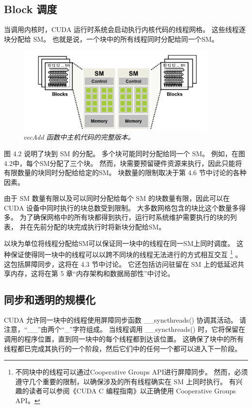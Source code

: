 \subsection{Block 调度}
当调用内核时，CUDA 运行时系统会启动执行内核代码的线程网格。 这些线程逐块分配给 SM。 
也就是说，一个块中的所有线程同时分配给同一个SM。

\begin{figure}[H]
	\centering
	\includegraphics[width=0.9\textwidth]{figs/F4.2.png}
	\caption{\textit{\color{red} vecAdd 函数中主机代码的完整版本。}}
\end{figure}

图 4.2 说明了块到 SM 的分配。 多个块可能同时分配给同一个 SM。 例如，在图4.2中，每个SM分配了三个块。 
然而，块需要预留硬件资源来执行，因此只能将有限数量的块同时分配给给定的SM。 块数量的限制取决于第 4.6 节中讨论的各种因素。

由于 SM 数量有限以及可以同时分配给每个 SM 的块数量有限，因此可以在 CUDA 设备中同时执行的块总数受到限制。 
大多数网格包含的块比这个数量多得多。 为了确保网格中的所有块都得到执行，运行时系统维护需要执行的块的列表，
并在先前分配的块完成执行时将新块分配给SM。

以块为单位将线程分配给SM可以保证同一块中的线程在同一SM上同时调度。 
这种保证使得同一块中的线程可以以跨不同块的线程无法进行的方式相互交互
\footnote{不同块中的线程可以通过Cooperative Groups API进行屏障同步。 
然而，必须遵守几个重要的限制，以确保涉及的所有线程确实在 SM 上同时执行。 
有兴趣的读者可以参阅《CUDA C 编程指南》以正确使用 Cooperative Groups API。} 。
这包括屏障同步，这将在 4.3 节中讨论。 
它还包括访问驻留在 SM 上的低延迟共享内存，这将在第 5 章“内存架构和数据局部性”中讨论。

\subsection{同步和透明的规模化}
CUDA 允许同一块中的线程使用屏障同步函数 \_\_syncthreads() 协调其活动。 请注意，“\_\_”由两个“\_”字符组成。 
当线程调用 \_\_syncthreads() 时，它将保留在调用的程序位置，直到同一块中的每个线程都到达该位置。 
这确保了块中的所有线程都已完成其执行的一个阶段，然后它们中的任何一个都可以进入下一阶段。

